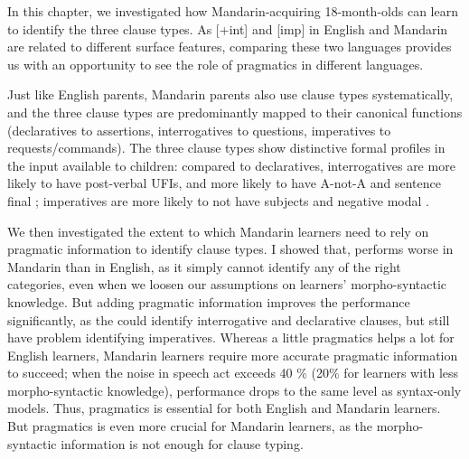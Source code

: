 In this chapter, we investigated how Mandarin-acquiring 18-month-olds can learn to identify the three clause types. As [+int] and [imp] in English and Mandarin are related to different surface features, comparing these two languages provides us with an opportunity to see the role of pragmatics in different languages.

Just like English parents, Mandarin parents also 
use clause types systematically, and the three clause types are predominantly mapped to their canonical functions (declaratives to assertions, interrogatives to questions, imperatives to requests/commands). The three clause types show distinctive formal profiles in the input available to children: compared to declaratives, interrogatives are more likely to have post-verbal UFIs, and more likely to have A-not-A and sentence final ; imperatives are more likely to not have subjects and negative modal .

We then investigated the extent to which Mandarin learners need to rely on pragmatic information to identify clause types. I showed that, \dlearnerabbr{} performs worse in Mandarin than in English, as it simply cannot identify any of the right categories, even when we loosen our assumptions on learners' morpho-syntactic knowledge. But adding pragmatic information improves the performance significantly, as the \plearnerabbr{} could identify interrogative and declarative clauses, but still have problem identifying imperatives. Whereas a little pragmatics helps a lot for English learners, Mandarin learners require more accurate pragmatic information to succeed; when the noise in speech act exceeds 40 \% (20\% for learners with less morpho-syntactic knowledge), performance drops to the same level as syntax-only models.
Thus, pragmatics is essential for both English and Mandarin learners. But pragmatics is even more crucial for Mandarin learners, as the morpho-syntactic information is not enough for clause typing. 



